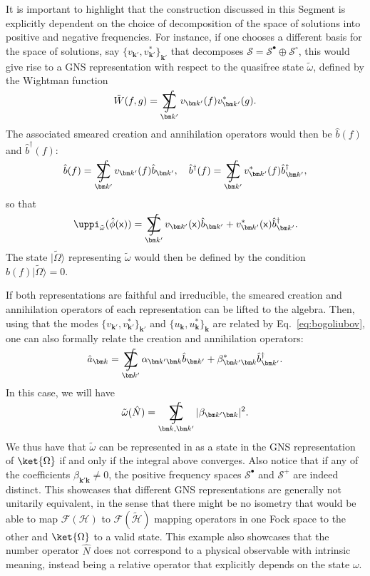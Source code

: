 \documentclass[letterpaper,12pt,titlepage,oneside,final]{book}
\renewcommand{\S}{\mathcal{S}}
\newcommand{\mf}{\mathsf}%
\DeclareMathOperator*{\sumint}{%
\mathchoice%
  {\ooalign{$\displaystyle\sum$\cr\hidewidth$\displaystyle\int$\hidewidth\cr}}
  {\ooalign{\raisebox{.14\height}{\scalebox{.7}{$\textstyle\sum$}}\cr\hidewidth$\textstyle\int$\hidewidth\cr}}
  {\ooalign{\raisebox{.2\height}{\scalebox{.6}{$\scriptstyle\sum$}}\cr$\scriptstyle\int$\cr}}
  {\ooalign{\raisebox{.2\height}{\scalebox{.6}{$\scriptstyle\sum$}}\cr$\scriptstyle\int$\cr}}
}
\begin{document}
It is important to highlight that the construction discussed in this Segment is explicitly dependent on the choice of decomposition of the space of solutions into positive and negative frequencies. For instance, if one chooses a different basis for the space of solutions, say $\{v_{\bm k'}, v_{\bm k'}^*\}_{\bm k'}$ that decomposes $\S = \mathcal{S}^\bullet\oplus \S^\circ$, this would give rise to a GNS representation with respect to the quasifree state $\tilde{\omega}$, defined by the Wightman function
\begin{equation}
    \tilde{W}(f,g) = \sumint_{\bm k'} v_{\bm k'}(f)v_{\bm k'}^*(g).
\end{equation}
The associated smeared creation and annihilation operators would then be $\hat{b}(f)$ and $\hat{b}^\dagger(f)$:
\begin{equation}
    \hat{b}(f) = \sumint_{\bm k'} v_{\bm k'}(f)\hat{b}_{\bm k'},\quad 
    \hat{b}^\dagger(f) = \sumint_{\bm k'} v_{\bm k'}^*(f)\hat{b}^\dagger_{\bm k'},
\end{equation}
so that
\begin{equation}
    \uppi_{\tilde{\omega}}(\hat{\phi}(\mf x)) = \sumint_{\bm k'}v_{\bm k'}(\mf x)\hat{b}_{\bm k'} + v_{\bm k'}^*(\mf x)\hat{b}^\dagger_{\bm k'}.
\end{equation}
The state $|{\tilde{\Omega}}\rangle$ representing $\tilde{\omega}$ would then be defined by the condition $\hat{b}(f)|\tilde{\Omega}\rangle = 0$. 

If both representations are faithful and irreducible, the smeared creation and annihilation operators of each representation can be lifted to the algebra. Then, using that the modes $\{v_{\bm k'}, v_{\bm k'}^*\}_{\bm k'}$ and $\{u_{\bm k}, u_{\bm k}^*\}_{\bm k}$ are related by Eq.~\eqref{eq:bogoliubov}, one can also formally relate the creation and annihilation operators:
\begin{equation}
    \hat{a}_{\bm k} = \sumint_{\bm k'} \alpha_{\bm k' \bm k} \hat{b}_{\bm k'}+\beta^*_{\bm k' \bm k} \hat{b}^\dagger_{\bm k'}.
\end{equation}
In this case, we will have
\begin{equation}
    \tilde{\omega}(\hat{N}) = \sumint_{\bm k,\bm k'}|\beta_{\bm k'\bm k}|^2.
\end{equation}
We thus have that $\tilde{\omega}$ can be represented in as a state in the GNS representation of $\ket{\Omega}$ if and only if the integral above converges. Also notice that if any of the coefficients $\beta_{\bm k'\bm k}\neq 0$, the positive frequency spaces $\S^\bullet$ and $\S^+$ are indeed distinct. This showcases that different GNS representations are generally not unitarily equivalent, in the sense that there might be no isometry that would be able to map $\mathcal{F}(\mathscr{H})$ to $\mathcal{F}(\tilde{\mathscr{H}})$ mapping operators in one Fock space to the other and $\ket{\Omega}$ to a valid state. This example also showcases that the number operator $\hat{N}$ does not correspond to a physical observable with intrinsic meaning, instead being a relative operator that explicitly depends on the state $\omega$.
\end{document}
